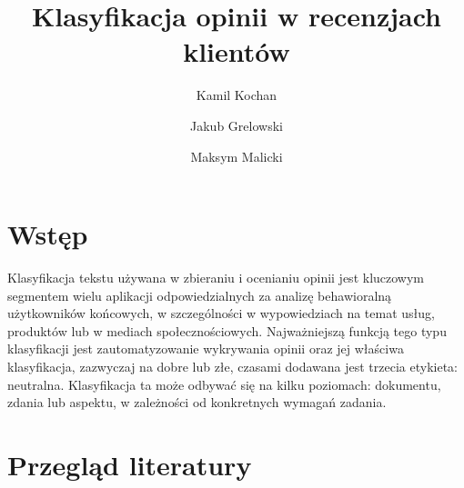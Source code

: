 \documentclass[runningheads]{llncs}
\begin{document}
%
\title{Klasyfikacja opinii w recenzjach klientów}
%
%
\author{Kamil Kochan \and
Jakub Grelowski \and
Maksym Malicki}
%
%
%
\maketitle              %
%


\section{Wstęp}

Klasyfikacja tekstu używana w zbieraniu i ocenianiu opinii jest kluczowym segmentem wielu aplikacji odpowiedzialnych za analizę behawioralną użytkowników końcowych, w szczególności w wypowiedziach na temat usług, produktów lub w mediach społecznościowych. Najważniejszą funkcją tego typu klasyfikacji jest zautomatyzowanie wykrywania opinii oraz jej właściwa klasyfikacja, zazwyczaj na dobre lub złe, czasami dodawana jest trzecia etykieta: neutralna. Klasyfikacja ta może odbywać się na kilku poziomach: dokumentu, zdania lub aspektu, w zależności od konkretnych wymagań zadania\cite{almatarneh2018lexicon}\cite{he2015novel}\cite{rahab2023rule}.

\section{Przegląd literatury}

\end{document}
